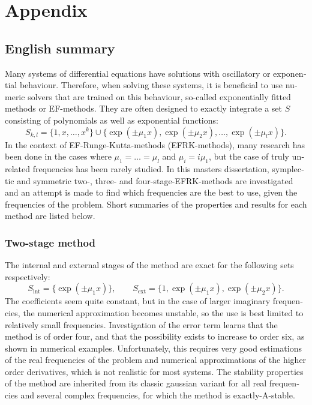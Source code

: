 \documentclass[12pt]{article}
\begin{document}
\section*{Appendix}
\begin{otherlanguage}{english}
\subsection{English summary}
Many systems of differential equations have solutions with oscillatory or exponential behaviour. Therefore, when solving these systems, it is beneficial to use numeric solvers that are trained on this behaviour, so-called exponentially fitted methods or EF-methods. They are often designed to exactly integrate a set \(S\) consisting of polynomials as well as exponential functions:
\[S_{k,l}=\{1,x,\dots,x^k\}\cup\{\exp(\pm\mu_1x),\exp(\pm\mu_2x),\dots,\exp(\pm\mu_lx)\}.\]
In the context of EF-Runge-Kutta-methods (EFRK-methods), many research has been done in the cases where \(\mu_1=\dots=\mu_l\) and \(\mu_i=i\mu_1\), but the case of truly unrelated frequencies has been rarely studied. In this masters dissertation, symplectic and symmetric two-, three- and four-stage-EFRK-methods are investigated and an attempt is made to find which frequencies are the best to use, given the frequencies of the problem. Short summaries of the properties and results for each method are listed below.

\subsubsection{Two-stage method}
The internal and external stages of the method are exact for the following sets respectively:
\[S_{\textrm{int}}=\{\exp(\pm\mu_1x)\},\qquad S_{\textrm{ext}}=\{1,\exp(\pm\mu_1x),\exp(\pm\mu_2x)\}.\]
The coefficients seem quite constant, but in the case of larger imaginary frequencies, the numerical approximation becomes unstable, so the use is best limited to relatively small frequencies. Investigation of the error term learns that the method is of order four, and that the possibility exists to increase to order six, as shown in numerical examples. Unfortunately, this requires very good estimations of the real frequencies of the problem and numerical approximations of the higher order derivatives, which is not realistic for most systems. The stability properties of the method are inherited from its classic gaussian variant for all real frequencies and several complex frequencies, for which the method is exactly-A-stable.


\end{otherlanguage}
\end{document}
